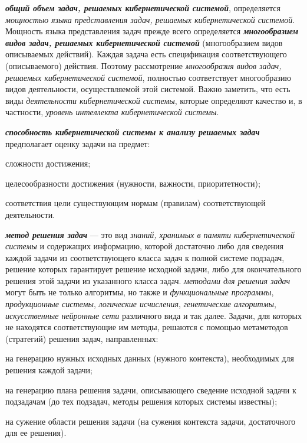 \textbf{\textit{общий объем задач, решаемых кибернетической системой}}, определяется \textit{мощностью языка представления задач, решаемых кибернетической системой}.
Мощность языка представления задач прежде всего определяется \textbf{\textit{многообразием видов задач, решаемых кибернетической системой}} (многообразием видов описываемых действий). Каждая задача есть спецификация соответствующего (описываемого) действия. 
Поэтому рассмотрение \textit{многообразия видов задач, решаемых кибернетической системой}, полностью соответствует многообразию видов деятельности, осуществляемой этой системой. Важно заметить, что есть виды \textit{деятельности кибернетической системы}, которые определяют качество и, в частности, \textit{уровень интеллекта кибернетической системы}.

\textbf{\textit{способность кибернетической системы к анализу решаемых задач}} предполагает оценку задачи на предмет:
\begin{textitemize}
    \item сложности достижения;
    \item целесообразности достижения (нужности, важности, приоритетности);
    \item соответствия цели существующим нормам (правилам) соответствующей деятельности.
\end{textitemize}

\textbf{\textit{метод решения задач}} --- это вид \textit{знаний, хранимых в памяти кибернетической системы} и содержащих информацию, которой достаточно либо для сведения каждой задачи из соответствующего класса задач к полной системе подзадач, решение которых гарантирует решение исходной задачи, либо для окончательного решения этой задачи из указанного класса задач. 
\textit{методами для решения задач} могут быть не только алгоритмы, но также и \textit{функциональные программы}, \textit{продукционные системы}, \textit{логические исчисления}, \textit{генетические алгоритмы}, \textit{искусственные нейронные сети} различного вида и так далее.
Задачи, для которых не находятся соответствующие им методы, решаются с помощью метаметодов (стратегий) решения задач, направленных:
\begin{textitemize}
    \item на генерацию нужных исходных данных (нужного контекста), необходимых для решения каждой задачи;
    \item на генерацию плана решения задачи, описывающего сведение исходной задачи к подзадачам (до тех подзадач, методы решения которых системы известны);
    \item на сужение области решения задачи (на сужения контекста задачи, достаточного для ее решения).
\end{textitemize}

